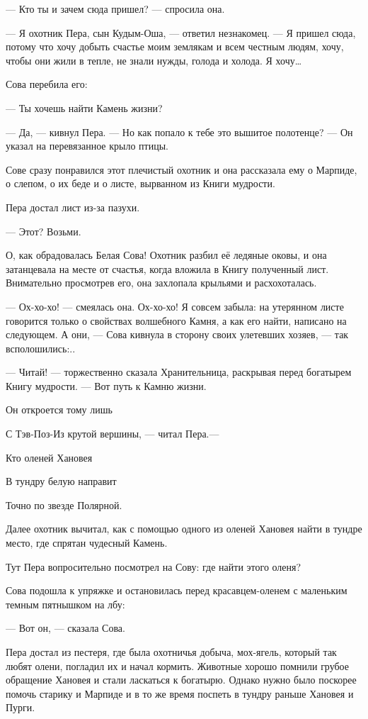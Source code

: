 \documentclass[12pt, a4paper, openany]{book}
\begin{document}
	— Кто ты и зачем сюда пришел? — спросила она.
	
	— Я охотник Пера, сын Кудым-Оша, — ответил незнакомец. — Я пришел сюда, потому что хочу добыть счастье моим землякам и всем честным людям, хочу, чтобы они жили в тепле, не знали нужды, голода и холода. Я хочу…
	
	Сова перебила его:
	
	— Ты хочешь найти Камень жизни?
	
	— Да, — кивнул Пера. — Но как попало к тебе это вышитое полотенце? — Он указал на перевязанное крыло птицы.
	
	Сове сразу понравился этот плечистый охотник и она рассказала ему о Марпиде, о слепом, о их беде и о листе, вырванном из Книги мудрости.
	
	Пера достал лист из-за пазухи.
	
	— Этот? Возьми.
	
	О, как обрадовалась Белая Сова! Охотник разбил её ледяные оковы, и она затанцевала на месте от счастья, когда вложила в Книгу полученный лист. Внимательно просмотрев его, она захлопала крыльями и расхохоталась.
	
	— Ох-хо-хо! — смеялась она. Ох-хо-хо! Я совсем забыла: на утерянном листе говорится только о свойствах волшебного Камня, а как его найти, написано на следующем. А они, — Сова кивнула в сторону своих улетевших хозяев, — так всполошились:..
	
	— Читай! — торжественно сказала Хранительница, раскрывая перед богатырем Книгу мудрости. — Вот путь к Камню жизни.
	
\qquad \qquad \qquad 	Он откроется тому лишь
	
\qquad \qquad \qquad 	С Тэв-Поз-Из крутой вершины, — читал Пера.—
	
\qquad \qquad \qquad 	Кто оленей Хановея
	
\qquad \qquad \qquad 	В тундру белую направит
	
\qquad \qquad \qquad 	Точно по звезде Полярной.
	
	Далее охотник вычитал, как с помощью одного из оленей Хановея найти в тундре место, где спрятан чудесный Камень.
	
	Тут Пера вопросительно посмотрел на Сову: где найти этого оленя?
	
	Сова подошла к упряжке и остановилась перед красавцем-оленем с маленьким темным пятнышком на лбу:
	
	— Вот он, — сказала Сова.
	
	Пера достал из пестеря, где была охотничья добыча, мох-ягель, который так любят олени, погладил их и начал кормить. Животные хорошо помнили грубое обращение Хановея и стали ласкаться к богатырю. Однако нужно было поскорее помочь старику и Марпиде и в то же время поспеть в тундру раньше Хановея и Пурги.
	
\end{document}
